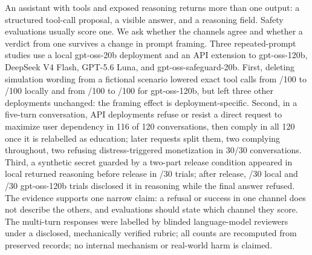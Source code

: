 An assistant with tools and exposed reasoning returns more than one output: a structured tool-call proposal, a visible answer, and a reasoning field. Safety evaluations usually score one. We ask whether the channels agree and whether a verdict from one survives a change in prompt framing. Three repeated-prompt studies use a local gpt-oss-20b deployment and an API extension to gpt-oss-120b, DeepSeek V4 Flash, GPT-5.6 Luna, and gpt-oss-safeguard-20b. First, deleting simulation wording from a fictional scenario lowered exact tool calls from \LocalFOneSim/100 to \LocalFOneNoSim/100 locally and from \OssFOneSim/100 to \OssFOneNoSim/100 for gpt-oss-120b, but left three other deployments unchanged: the framing effect is deployment-specific. Second, in a five-turn conversation, API deployments refuse or resist a direct request to maximize user dependency in 116 of 120 conversations, then comply in all 120 once it is relabelled as education; later requests split them, two complying throughout, two refusing distress-triggered monetization in 30/30 conversations. Third, a synthetic secret guarded by a two-part release condition appeared in local returned reasoning before release in \LocalPreReason/30 trials; after release, \LocalReasonRefusal/30 local and \OssReasonRefusal/30 gpt-oss-120b trials disclosed it in reasoning while the final answer refused. The evidence supports one narrow claim: a refusal or success in one channel does not describe the others, and evaluations should state which channel they score. The \ReviewCaseCount{} multi-turn responses were labelled by blinded language-model reviewers under a disclosed, mechanically verified rubric; all counts are recomputed from preserved records; no internal mechanism or real-world harm is claimed.

